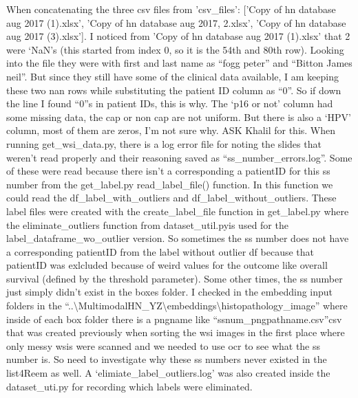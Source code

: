 \documentclass{article}%
\begin{document}
%
When concatenating the three csv files from 'csv\_files': {[}'Copy of hn database aug 2017 (1).xlsx', 'Copy of hn database aug 2017, 2.xlsx', 'Copy of hn database aug 2017 (3).xlsx'{]}. I noticed from 'Copy of hn database aug 2017 (1).xlsx' that 2 were ‘NaN’s (this started from index 0, so it is the 54th and 80th row). Looking into the file they were with first and last name as “fogg peter” and “Bitton James neil”. But since they still have some of the clinical data available, I am keeping these two nan rows while substituting the patient ID column as “0”. So if down the line I found “0”s in patient IDs, this is why. %
\newline%
\newline%
%
The ‘p16 or not’ column had some missing data, the cap or non cap are not uniform. But there is also a ‘HPV’ column, most of them are zeros, I’m not sure why. ASK Khalil for this. %
\newline%
\newline%
%
When running get\_wsi\_data.py, there is a log error file for noting the slides that weren’t read properly and their reasoning saved as “ss\_number\_errors.log”. Some of these were read because there isn’t a corresponding a patientID for this ss number from the get\_label.py read\_label\_file() function. In this function we could read the df\_label\_with\_outliers and df\_label\_without\_outliers. These label files were created with the create\_label\_file function in get\_label.py  where the eliminate\_outliers function from dataset\_util.pyis used for the label\_dataframe\_wo\_outlier version. So sometimes the ss number does not have a  corresponding patientID from the label without outlier df because that patientID was exlcluded because of weird values for the outcome like overall survival (defined by the threshold parameter). Some other times, the ss number just simply didn’t exist in the boxes folder. I checked in the embedding input folders in the “..\textbackslash{}MultimodalHN\_YZ\textbackslash{}embeddings\textbackslash{}histopathology\_image” where inside of each box folder there is a pngname like “ssnum\_pngpathname.csv”csv that was created previously when sorting the wsi images in the first place where only messy wsis were scanned and we needed to use ocr to see what the ss number is. So need to investigate why these ss numbers never existed in the list4Reem as well. %
\newline%
\newline%
%
A ‘elimiate\_label\_outliers.log’ was also created inside the dataset\_uti.py for recording which labels were eliminated. %
\end{document}

